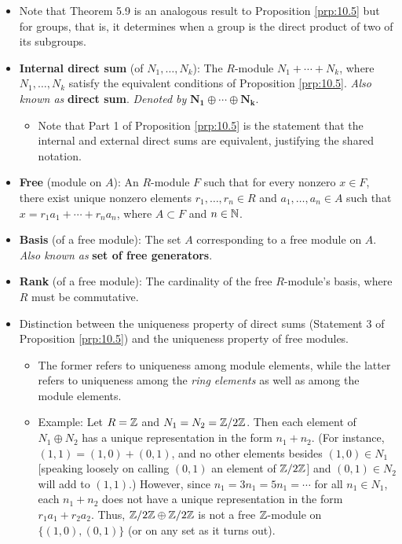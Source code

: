 \documentclass[../notes.tex]{subfiles}
\begin{document}
\begin{itemize}
\begin{proposition}
\begin{enumerate}
            \item Every $x\in N_1+\cdots+N_k$ can be written \emph{uniquely} in the form $a_1+\cdots+a_k$ with $a_i\in N_i$.
        \end{enumerate}
        \begin{proof}
            Given.
        \end{proof}
    \end{proposition}
    \item Note that Theorem 5.9 is an analogous result to Proposition \ref{prp:10.5} but for groups, that is, it determines when a group is the direct product of two of its subgroups.
    \item \textbf{Internal direct sum} (of $N_1,\dots,N_k$): The $R$-module $N_1+\cdots+N_k$, where $N_1,\dots,N_k$ satisfy the equivalent conditions of Proposition \ref{prp:10.5}. \emph{Also known as} \textbf{direct sum}. \emph{Denoted by} $\bm{N_1\oplus\cdots\oplus N_k}$.
    \begin{itemize}
        \item Note that Part 1 of Proposition \ref{prp:10.5} is the statement that the internal and external direct sums are equivalent, justifying the shared notation.
    \end{itemize}
    \item \textbf{Free} (module on $A$): An $R$-module $F$ such that for every nonzero $x\in F$, there exist unique nonzero elements $r_1,\dots,r_n\in R$ and $a_1,\dots,a_n\in A$ such that $x=r_1a_1+\cdots+r_na_n$, where $A\subset F$ and $n\in\mathbb{N}$.
    \item \textbf{Basis} (of a free module): The set $A$ corresponding to a free module on $A$. \emph{Also known as} \textbf{set of free generators}.
    \item \textbf{Rank} (of a free module): The cardinality of the free $R$-module's basis, where $R$ must be commutative.
    \item Distinction between the uniqueness property of direct sums (Statement 3 of Proposition \ref{prp:10.5}) and the uniqueness property of free modules.
    \begin{itemize}
        \item The former refers to uniqueness among module elements, while the latter refers to uniqueness among the \emph{ring elements} as well as among the module elements.
        \item Example: Let $R=\mathbb{Z}$ and $N_1=N_2=\mathbb{Z}/2\mathbb{Z}$. Then each element of $N_1\oplus N_2$ has a unique representation in the form $n_1+n_2$. (For instance, $(1,1)=(1,0)+(0,1)$, and no other elements besides $(1,0)\in N_1$ [speaking loosely on calling $(0,1)$ an element of $\mathbb{Z}/2\mathbb{Z}$] and $(0,1)\in N_2$ will add to $(1,1)$.) However, since $n_1=3n_1=5n_1=\cdots$ for all $n_1\in N_1$, each $n_1+n_2$ does not have a unique representation in the form $r_1a_1+r_2a_2$. Thus, $\mathbb{Z}/2\mathbb{Z}\oplus\mathbb{Z}/2\mathbb{Z}$ is not a free $\mathbb{Z}$-module on $\{(1,0),(0,1)\}$ (or on any set as it turns out).

\end{itemize}
\end{itemize}
\end{document}
